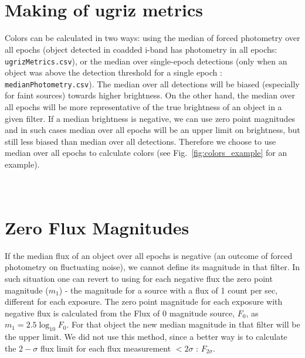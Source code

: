 \documentclass[fleqn,usenatbib]{mnras}  %
\begin{document}
\section{\\ Making of ugriz metrics }
\label{App:AppendixC}

Colors can be calculated in two ways: using the median of forced photometry over all epochs (object detected in coadded i-band has photometry in all epochs:  \verb|ugrizMetrics.csv|), or the median over single-epoch detections (only when an object was above the detection threshold for a single epoch : \verb|medianPhotometry.csv|).  
The median over all detections will be biased (especially for faint sources) towards higher brightness.  On the other hand, the median over all epochs will be more representative of the true brightness of an object in a given filter.  If a median brightness is negative, we can use zero point magnitudes and in such cases median over all epochs will be an upper limit on brightness, but still less biased than median over all detections. Therefore  we choose to use median over all epochs to calculate colors (see Fig.~\ref{fig:colors_example} for an example).  

\section{\\ Zero Flux Magnitudes }
\label{App:AppendixD}

If the median flux of an object over all epochs  is negative (an outcome of forced photometry on fluctuating noise), we cannot define its magnitude in that filter.  In such situation one can revert to  using for each negative flux the zero point magnitude ($m_1$) - the magnitude for a source with a flux of 1 count per sec, different for each exposure.  The zero point magnitude for each exposure with negative flux is calculated from the  Flux of 0 magnitude source,  $F_0$,  as  $m_{1} = 2.5 \log_{10}{F_{0}}$. For that object the new median magnitude in that filter will be the upper limit. We did not use this method, since a better way is to calculate the $2-\sigma$ flux limit for each flux measurement $< 2 \sigma$ : $F_{2\sigma}$. 




%



\bsp	%
\label{lastpage}
\end{document}
